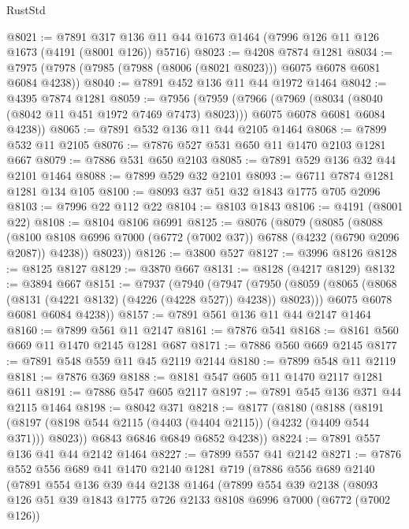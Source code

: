 \begin{lexlean}{RustStd}
\begin{coremodule}
@8021 := @7891 @317 @136 @11 @44 @1673 @1464 (@7996 @126 @11 @126 @1673 (@4191 (@8001 @126)) @5716)
@8023 := @4208 @7874 @1281
@8034 := @7975 (@7978 (@7985 (@7988 (@8006 (@8021 @8023))) @6075 @6078 @6081 @6084 @4238))
@8040 := @7891 @452 @136 @11 @44 @1972 @1464
@8042 := @4395 @7874 @1281
@8059 := @7956
    (@7959
      (@7966
        (@7969 (@8034 (@8040 (@8042 @11 @451 @1972 @7469 @7473) @8023)))
        @6075
        @6078
        @6081
        @6084
        @4238))
@8065 := @7891 @532 @136 @11 @44 @2105 @1464
@8068 := @7899 @532 @11 @2105
@8076 := @7876 @527 @531 @650 @11 @1470 @2103 @1281 @667
@8079 := @7886 @531 @650 @2103
@8085 := @7891 @529 @136 @32 @44 @2101 @1464
@8088 := @7899 @529 @32 @2101
@8093 := @6711 @7874 @1281 @1281 @134 @105
@8100 := @8093 @37 @51 @32 @1843 @1775 @705 @2096
@8103 := @7996 @22 @112 @22
@8104 := @8103 @1843
@8106 := @4191 (@8001 @22)
@8108 := @8104 @8106 @6991
@8125 := @8076
    (@8079
      (@8085
        (@8088
          (@8100 @8108 @6996 @7000 (@6772 (@7002 @37)) @6788 (@4232 (@6790 @2096 @2087)) @4238))
        @8023))
@8126 := @3800 @527
@8127 := @3996 @8126
@8128 := @8125 @8127
@8129 := @3870 @667
@8131 := @8128 (@4217 @8129)
@8132 := @3894 @667
@8151 := @7937
    (@7940
      (@7947
        (@7950 (@8059 (@8065 (@8068 (@8131 (@4221 @8132) (@4226 (@4228 @527)) @4238)) @8023)))
        @6075
        @6078
        @6081
        @6084
        @4238))
@8157 := @7891 @561 @136 @11 @44 @2147 @1464
@8160 := @7899 @561 @11 @2147
@8161 := @7876 @541
@8168 := @8161 @560 @669 @11 @1470 @2145 @1281 @687
@8171 := @7886 @560 @669 @2145
@8177 := @7891 @548 @559 @11 @45 @2119 @2144
@8180 := @7899 @548 @11 @2119
@8181 := @7876 @369
@8188 := @8181 @547 @605 @11 @1470 @2117 @1281 @611
@8191 := @7886 @547 @605 @2117
@8197 := @7891 @545 @136 @371 @44 @2115 @1464
@8198 := @8042 @371
@8218 := @8177
    (@8180
      (@8188
        (@8191 (@8197 (@8198 @544 @2115 (@4403 (@4404 @2115)) (@4232 (@4409 @544 @371))) @8023))
        @6843
        @6846
        @6849
        @6852
        @4238))
@8224 := @7891 @557 @136 @41 @44 @2142 @1464
@8227 := @7899 @557 @41 @2142
@8271 := @7876
    @552
    @556
    @689
    @41
    @1470
    @2140
    @1281
    @719
    (@7886
      @556
      @689
      @2140
      (@7891
        @554
        @136
        @39
        @44
        @2138
        @1464
        (@7899
          @554
          @39
          @2138
          (@8093
            @126
            @51
            @39
            @1843
            @1775
            @726
            @2133
            @8108
            @6996
            @7000
            (@6772 (@7002 @126))

\end{coremodule}
\end{lexlean}
